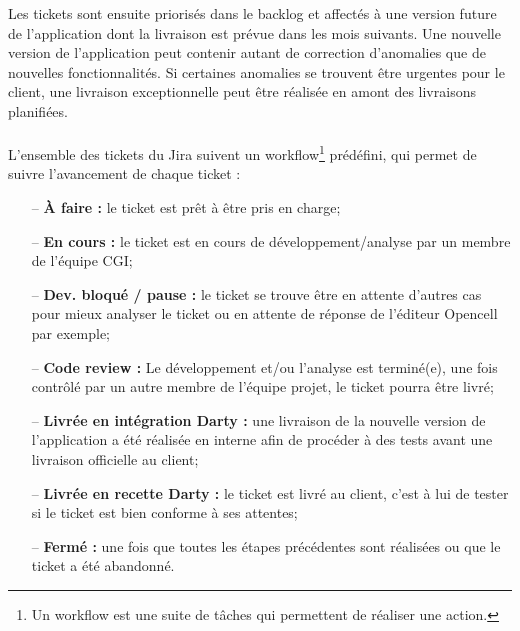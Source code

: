 \documentclass[12pt, a4paper]{report}
\begin{document}
	\newpage
	\noindent
	Les tickets sont ensuite priorisés dans le backlog et affectés à une version future de l'application dont la livraison est prévue dans les mois suivants. Une nouvelle version de l'application peut contenir autant de correction d'anomalies que de nouvelles fonctionnalités. Si certaines anomalies se trouvent être urgentes pour le client, une livraison exceptionnelle peut être réalisée en amont des livraisons planifiées.
	\\\\
	L'ensemble des tickets du Jira suivent un workflow\footnote{Un workflow est une suite de tâches qui permettent de réaliser une action.} prédéfini, qui permet de suivre l'avancement de chaque ticket :
	\\
	\begin{itemize}
		\item[–] \textbf{À faire :} le ticket est prêt à être pris en charge;
		\item[–] \textbf{En cours :} le ticket est en cours de développement/analyse par un membre de l'équipe CGI;
		\item[–] \textbf{Dev. bloqué / pause :} le ticket se trouve être en attente d'autres cas pour mieux analyser le ticket ou en attente de réponse de l'éditeur Opencell par exemple;
		\item[–] \textbf{Code review :} Le développement et/ou l'analyse est terminé(e), une fois contrôlé par un autre membre de l'équipe projet, le ticket pourra être livré;
		\item[–] \textbf{Livrée en intégration Darty :} une livraison de la nouvelle version de l'application a été réalisée en interne afin de procéder à des tests avant une livraison officielle au client;
		\item[–] \textbf{Livrée en recette Darty :} le ticket est livré au client, c'est à lui de tester si le ticket est bien conforme à ses attentes;
		\item[–] \textbf{Fermé :} une fois que toutes les étapes précédentes sont réalisées ou que le ticket a été abandonné.
	\end{itemize}

	\newpage
\end{document}
